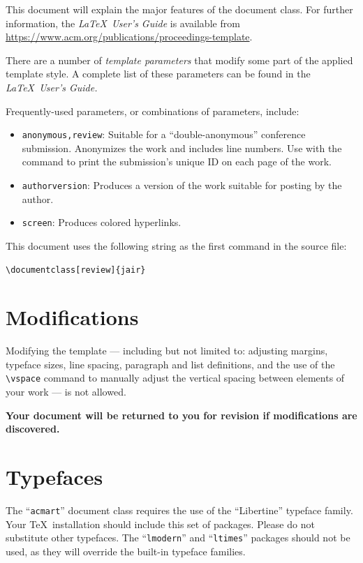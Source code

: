 \documentclass[review]{jair}
\begin{document}
This document will explain the major features of the document
class. For further information, the {\itshape \LaTeX\ User's Guide} is
available from
\url{https://www.acm.org/publications/proceedings-template}.

There are a number of {\itshape template parameters}
that modify some part of the applied template style. A complete list
of these parameters can be found in the {\itshape \LaTeX\ User's Guide.}

Frequently-used parameters, or combinations of parameters, include:
\begin{itemize}
\item {\texttt{anonymous,review}}: Suitable for a ``double-anonymous''
  conference submission. Anonymizes the work and includes line
  numbers. Use with the \texttt{\acmSubmissionID} command to print the
  submission's unique ID on each page of the work.
\item{\texttt{authorversion}}: Produces a version of the work suitable
  for posting by the author.
\item{\texttt{screen}}: Produces colored hyperlinks.
\end{itemize}

This document uses the following string as the first command in the
source file:
\begin{verbatim}
\documentclass[review]{jair}
\end{verbatim}

\section{Modifications}

Modifying the template --- including but not limited to: adjusting
margins, typeface sizes, line spacing, paragraph and list definitions,
and the use of the \verb|\vspace| command to manually adjust the
vertical spacing between elements of your work --- is not allowed.

{\bfseries Your document will be returned to you for revision if
  modifications are discovered.}

\section{Typefaces}

The ``\verb|acmart|'' document class requires the use of the
``Libertine'' typeface family. Your \TeX\ installation should include
this set of packages. Please do not substitute other typefaces. The
``\verb|lmodern|'' and ``\verb|ltimes|'' packages should not be used,
as they will override the built-in typeface families.
\end{document}
